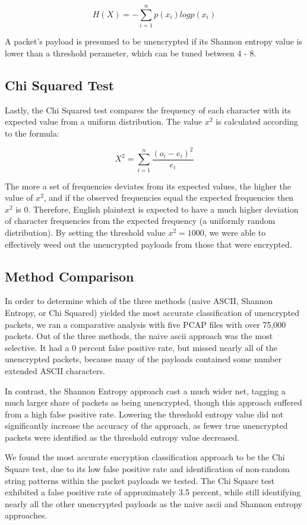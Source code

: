 $$H(X) = - \sum_{i = 1}^{n} p(x_i) log p(x_i)$$

A packet's payload is presumed to be unencrypted if its Shannon entropy value is lower than a threshold perameter, which can be tuned between 4 - 8. 

\subsection{Chi Squared Test}
Lastly, the Chi Squared test compares the frequency of each character with its expected value from a uniform distribution. The value $x^2$ is calculated according to the formula:

$$X^2 = \sum_{i=1}^{n} \frac{(o_i-e_i)^2}{e_i}$$

The more a set of frequencies deviates from its expected values, the higher the value of $x^2$, and if the observed frequencies equal the expected frequencies then $x^2$ is 0. Therefore, English plaintext is expected to have a much higher deviation of character frequencies from the expected frequency (a uniformly random distribution). By setting the threshold value $x^2 = 1000$, we were able to effectively weed out the unencrypted payloads from those that were encrypted. 

\subsection{Method Comparison}
In order to determine which of the three methods (naive ASCII, Shannon Entropy, or Chi Squared) yielded the most accurate classification of unencrypted packets, we ran a comparative analysis with five PCAP files with over 75,000 packets. Out of the three methods, the naive ascii approach was the most selective. It had a 0 percent false positive rate, but missed nearly all of the unencrypted packets, because many of the payloads contained some number extended ASCII characters. 

In contrast, the Shannon Entropy approach cast a much wider net, tagging a much larger share of packets as being unencrypted, though this approach suffered from a high false positive rate. Lowering the threshold entropy value did not significantly increase the accuracy of the approach, as fewer true unencrypted packets were identified as the threshold entropy value decreased. 

We found the most accurate encryption classification approach to be the Chi Square test, due to its low false positive rate and identification of non-random string patterns within the packet payloads we tested. The Chi Square test exhibited a false positive rate of approximately 3.5 percent, while still identifying nearly all the other unencrypted payloads as the naive ascii and Shannon entropy approaches.


